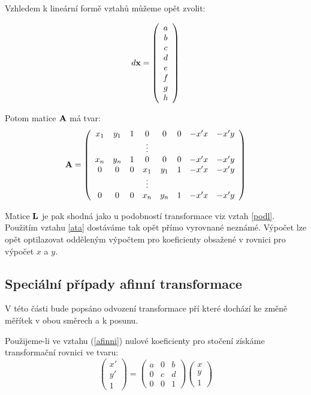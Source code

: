 Vzhledem k lineární formě vztahů můžeme opět zvolit:

$$ d{\bf x} =
\left(
\begin{array}{c}
a\\
b\\
c\\
d\\
e\\
f\\
g\\
h
\end{array}
\right) $$

Potom matice ${\bf A}$ má tvar:
$$
{\bf A} = 
\left(
\begin{array}{cccccccc}
x_{1} & y_{1} & 1  &  0    & 0      & 0 & -x'x & -x'y \\
      &       &       &  \vdots     &      &   &   &  \\
x_{n} & y_{n} & 1  &  0    & 0      & 0 & -x'x & -x'y \\
 0    & 0     & 0  &  x_{1} & y_{1} & 1 & -x'x & -x'y \\
      &       &       &  \vdots     &      &   &   &  \\
 0    & 0     & 0  &  x_{n} & y_{n} & 1 & -x'x & -x'y \\
\end{array}
\right)
$$ 

Matice ${\bf L}$ je pak shodná jako u podobností transformace viz vztah
\ref{podl}. Použitím vztahu \ref{ata} dostáváme tak opět přímo vyrovnané
neznámé. Výpočet lze opět optilazovat odděleným výpočtem pro koeficienty
obsažené v rovnici pro výpočet $x$ a $y$.

\subsection{Speciální případy afinní transformace}

V této části bude popsáno odvození transformace pří které dochází ke změně
měřítek v obou směrech a k posunu.

Použijeme-li ve vztahu (\ref{afinni}) nulové koeficienty pro stočení získáme
transformační rovnici ve tvaru: $$
\left(
\begin{array}{c}
x'\\
y'\\ 
1
\end{array}
\right) 
= 
\left(
\begin{array}{ccc}
a & 0  & b\\
0 &  c & d\\ 
0 & 0 & 1
\end{array}
\right) 
\left(
\begin{array}{c}
x\\
y\\ 
1
\end{array}
\right) 
$$

